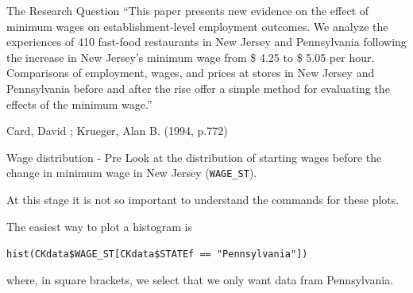 \documentclass[
  ignorenonframetext,
]{beamer}
\newenvironment{Shaded}{\begin{snugshade}}{\end{snugshade}}
\newcommand{\FunctionTok}[1]{\textcolor[rgb]{0.00,0.00,0.00}{#1}}
\newcommand{\NormalTok}[1]{#1}
\newcommand{\SpecialCharTok}[1]{\textcolor[rgb]{0.00,0.00,0.00}{#1}}
\newcommand{\StringTok}[1]{\textcolor[rgb]{0.31,0.60,0.02}{#1}}
\begin{document}
\begin{frame}{The Research Question}
\protect\hypertarget{the-research-question-1}{}
``This paper presents new evidence on the effect of minimum wages on
establishment-level employment outcomes. We analyze the experiences of
410 fast-food restaurants in New Jersey and Pennsylvania following the
increase in New Jersey's minimum wage from \$ 4.25 to \$ 5.05 per hour.
Comparisons of employment, wages, and prices at stores in New Jersey and
Pennsylvania before and after the rise offer a simple method for
evaluating the effects of the minimum wage.''

Card, David ; Krueger, Alan B. (1994, p.772)
\end{frame}

\begin{frame}[fragile]{Wage distribution - Pre}
\protect\hypertarget{wage-distribution---pre}{}
Look at the distribution of starting wages before the change in minimum
wage in New Jersey (\texttt{WAGE\_ST}).

At this stage it is not so important to understand the commands for
these plots.

The easiest way to plot a histogram is

\texttt{hist(CKdata\$WAGE\_ST{[}CKdata\$STATEf\ ==\ "Pennsylvania"{]})}

where, in square brackets, we select that we only want data fram
Pennsylvania.

\footnotesize

\begin{Shaded}
\end{Shaded}

\normalsize
\end{frame}
\end{document}
